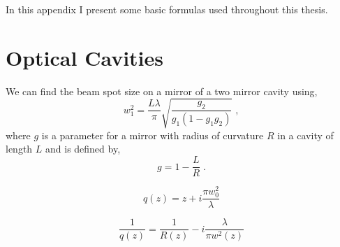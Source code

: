 In this appendix I present some basic formulas used throughout this thesis.

\section{Optical Cavities}

We can find the beam spot size on a mirror of a two mirror cavity using,
\begin{equation}
w_1^2=\frac{L\lambda}{\pi}\sqrt{\frac{g_2}{g_1\left(1-g_1g_2\right)}}\;,
\end{equation}
where $g$ is a parameter for a mirror with radius of curvature $R$ in a
cavity of length $L$ and is defined by,
\begin{equation}
g=1-\frac{L}{R}\;.
\end{equation}

\begin{equation}
q(z)=z + i\frac{\pi w_0^2}{\lambda}
\end{equation}

\begin{equation}
\frac{1}{q(z)} = \frac{1}{R(z)} -i \frac{\lambda}{\pi w^2(z)}
\end{equation}

